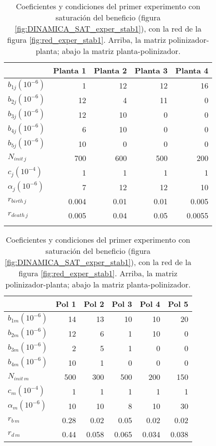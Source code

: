 \begin{table}[h!]
\centering
\normalsize
\caption{Coeficientes y condiciones del primer experimento con saturación del beneficio (figura \ref{fig:DINAMICA_SAT_exper_stab1}), con la red de la figura \ref{fig:red_exper_stab1}. Arriba, la matriz polinizador-planta; abajo la matriz planta-polinizador.}
\footnotesize
\begin{tabular}{lrrrr}
\hline
 & Planta 1 & Planta 2 & Planta 3 & Planta 4  \\
\hline
$b_{1j}${\tiny $\left(10^{-6}\right)$} & 1 & 12 & 12 & 16\\
$b_{2j}${\tiny $\left(10^{-6}\right)$} & 12 & 4 & 11 & 0 \\
$b_{3j}${\tiny $\left(10^{-6}\right)$} & 12 & 10 & 0 & 0 \\
$b_{4j}${\tiny $\left(10^{-6}\right)$} & 6 & 10 & 0 & 0 \\
$b_{5j}${\tiny $\left(10^{-6}\right)$} & 10 & 0 & 0 & 0 \\
$N_{init\,j}$ & 700 & 600 & 500 & 200 \\
$c_{j}${\tiny $\left(10^{-4}\right)$} & 1 & 1 & 1 & 1 \\
$\alpha_{j}${\tiny $\left(10^{-6}\right)$} & 7 & 12 & 12 & 10 \\
$r_{birth\, j}$ & 0.004 & 0.01 & 0.01 & 0.005 \\
$r_{death\, j}$ & 0.005 & 0.04 & 0.05 & 0.0055 \\
\hline
\\
\end{tabular}
\begin{tabular}{lrrrrr}
\hline
 &Pol 1&Pol 2&Pol 3&Pol 4&Pol 5\\
\hline
$b_{1m}${\tiny $\left(10^{-6}\right)$}&14&13&10&10&20\\
$b_{2m}${\tiny $\left(10^{-6}\right)$}&12&6&1&10&0\\
$b_{3m}${\tiny $\left(10^{-6}\right)$}&2&5&1&0&0\\
$b_{4m}${\tiny $\left(10^{-6}\right)$}&10&1&0&0&0\\
$N_{init\,m}$ & 500 & 300 & 500 & 200 & 150 \\
$c_{m}${\tiny $\left(10^{-4}\right)$} & 1 & 1 & 1 & 1 & 1\\
$\alpha_{m}${\tiny $\left(10^{-6}\right)$} & 10 & 10 & 8 & 10 & 30\\
$r_{b\, m}$ & 0.28 & 0.02 & 0.05 & 0.02 & 0.02 \\
$r_{d\, m}$ & 0.44 & 0.058 & 0.065 & 0.034 & 0.038 \\
\hline
\end{tabular}
\label{tab:SAT_experiment1}
\end{table}

